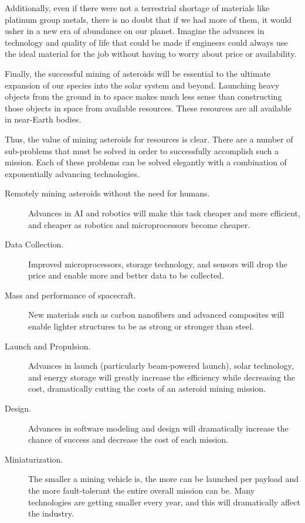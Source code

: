 \documentclass[letter,11pt]{article}
\begin{document}
Additionally, even if there were not a terrestrial shortage of materials
like platinum group metals, there is no doubt that if we had more
of them, it would usher in a new era of abundance on our planet. Imagine
the advances in technology and quality of life that could be made
if engineers could always use the ideal material for the job without
having to worry about price or availability.

Finally, the successful mining of asteroids will be essential to the
ultimate expansion of our species into the solar system and beyond.
Launching heavy objects from the ground in to space makes much less
sense than constructing those objects in space from available resources.
These resources are all available in near-Earth bodies.

Thus, the value of mining asteroids for resources is clear. There
are a number of sub-problems that must be solved in order to successfully
accomplish such a mission\cite{gerlach}. Each of these problems can
be solved elegantly with a combination of exponentially advancing
technologies.

\begin{description}
\item[Remotely mining asteroids without the need for humans. ]Advances
in AI and robotics will make this task cheaper and more efficient,
and cheaper as robotics and microprocessors become cheaper.
\item[Data Collection. ]Improved microprocessors, storage technology,
and sensors will drop the price and enable more and better data to
be collected. 
\item[Mass and performance of spacecraft.] New materials such as carbon
nanofibers and advanced composites will enable lighter structures
to be as strong or stronger than steel.
\item[Launch and Propulsion. ]Advances in launch (particularly beam-powered
launch), solar technology, and energy storage will greatly increase
the efficiency while decreasing the cost, dramatically cutting the
costs of an asteroid mining mission.
\item[Design.] Advances in software modeling and design will dramatically
increase the chance of success and decrease the cost of each mission.
\item[Miniaturization. ]The smaller a mining vehicle is, the more
can be launched per payload and the more fault-tolerant the entire
overall mission can be. Many technologies are getting smaller every
year, and this will dramatically affect the industry.
\end{description}
\end{document}

